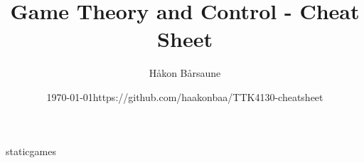 \documentclass{article}
\title{Game Theory and Control - Cheat Sheet}
\author{Håkon Bårsaune}
\date{\centering\today\endgraf\bigskip https://github.com/haakonbaa/TTK4130-cheatsheet}
\begin{document}
\maketitle

\tableofcontents

\newpage

\begin{multicols}{2}
{staticgames}
\end{multicols}
\end{document}
